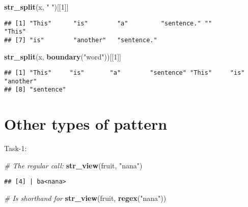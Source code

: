 \documentclass[
]{article}
\newenvironment{Shaded}{\begin{snugshade}}{\end{snugshade}}
\newcommand{\CommentTok}[1]{\textcolor[rgb]{0.56,0.35,0.01}{\textit{#1}}}
\newcommand{\DecValTok}[1]{\textcolor[rgb]{0.00,0.00,0.81}{#1}}
\newcommand{\FunctionTok}[1]{\textcolor[rgb]{0.13,0.29,0.53}{\textbf{#1}}}
\newcommand{\NormalTok}[1]{#1}
\newcommand{\StringTok}[1]{\textcolor[rgb]{0.31,0.60,0.02}{#1}}
\begin{document}
\begin{Shaded}
\begin{Highlighting}[]
\FunctionTok{str\_split}\NormalTok{(x, }\StringTok{" "}\NormalTok{)[[}\DecValTok{1}\NormalTok{]]}
\end{Highlighting}
\end{Shaded}

\begin{verbatim}
## [1] "This"      "is"        "a"         "sentence." ""          "This"     
## [7] "is"        "another"   "sentence."
\end{verbatim}

\begin{Shaded}
\begin{Highlighting}[]
\FunctionTok{str\_split}\NormalTok{(x, }\FunctionTok{boundary}\NormalTok{(}\StringTok{"word"}\NormalTok{))[[}\DecValTok{1}\NormalTok{]]}
\end{Highlighting}
\end{Shaded}

\begin{verbatim}
## [1] "This"     "is"       "a"        "sentence" "This"     "is"       "another" 
## [8] "sentence"
\end{verbatim}

\hypertarget{other-types-of-pattern}{%
\section{Other types of pattern}\label{other-types-of-pattern}}

Task-1:

\begin{Shaded}
\begin{Highlighting}[]
\CommentTok{\# The regular call:}
\FunctionTok{str\_view}\NormalTok{(fruit, }\StringTok{"nana"}\NormalTok{)}
\end{Highlighting}
\end{Shaded}

\begin{verbatim}
## [4] | ba<nana>
\end{verbatim}

\begin{Shaded}
\begin{Highlighting}[]
\CommentTok{\# Is shorthand for}
\FunctionTok{str\_view}\NormalTok{(fruit, }\FunctionTok{regex}\NormalTok{(}\StringTok{"nana"}\NormalTok{))}
\end{Highlighting}
\end{Shaded}
\end{document}
